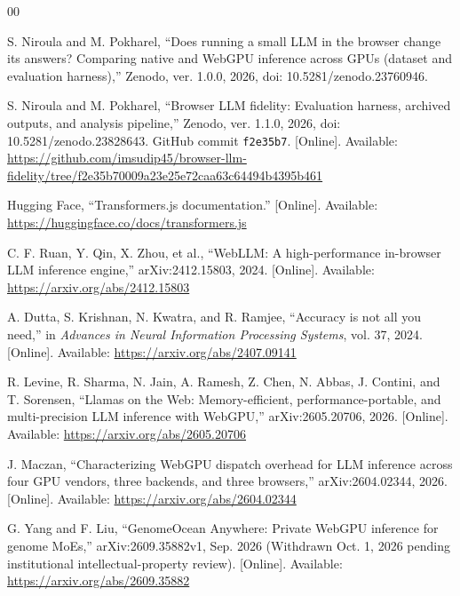 \documentclass[conference]{IEEEtran}
\begin{document}
\raggedbottom
\begin{thebibliography}{00}
\setlength{\itemsep}{1.5pt plus 0.5pt}

S. Niroula and M. Pokharel,
``Does running a small LLM in the browser change its answers?
Comparing native and WebGPU inference across GPUs
(dataset and evaluation harness),''
Zenodo, ver. 1.0.0, 2026,
doi: 10.5281/zenodo.23760946.

S. Niroula and M. Pokharel,
``Browser LLM fidelity: Evaluation harness, archived outputs,
and analysis pipeline,''
Zenodo, ver. 1.1.0, 2026,
doi: 10.5281/zenodo.23828643.
GitHub commit \texttt{f2e35b7}.
[Online]. Available:
\url{https://github.com/imsudip45/browser-llm-fidelity/tree/f2e35b70009a23e25e72caa63c64494b4395b461}

Hugging Face,
``Transformers.js documentation.''
[Online]. Available:
\url{https://huggingface.co/docs/transformers.js}

C. F. Ruan, Y. Qin, X. Zhou, et al.,
``WebLLM: A high-performance in-browser LLM inference engine,''
arXiv:2412.15803, 2024.
[Online]. Available:
\url{https://arxiv.org/abs/2412.15803}

A. Dutta, S. Krishnan, N. Kwatra, and R. Ramjee,
``Accuracy is not all you need,''
in \emph{Advances in Neural Information Processing Systems},
vol. 37, 2024.
[Online]. Available:
\url{https://arxiv.org/abs/2407.09141}

R. Levine, R. Sharma, N. Jain, A. Ramesh, Z. Chen, N. Abbas,
J. Contini, and T. Sorensen,
``Llamas on the Web: Memory-efficient, performance-portable,
and multi-precision LLM inference with WebGPU,''
arXiv:2605.20706, 2026.
[Online]. Available:
\url{https://arxiv.org/abs/2605.20706}

J. Maczan,
``Characterizing WebGPU dispatch overhead for LLM inference
across four GPU vendors, three backends, and three browsers,''
arXiv:2604.02344, 2026.
[Online]. Available:
\url{https://arxiv.org/abs/2604.02344}


G. Yang and F. Liu,
``GenomeOcean Anywhere: Private WebGPU inference for genome
MoEs,''
arXiv:2609.35882v1, Sep. 2026 (Withdrawn Oct. 1, 2026 pending
institutional intellectual-property review).
[Online]. Available:
\url{https://arxiv.org/abs/2609.35882}



\end{thebibliography}
\end{document}
